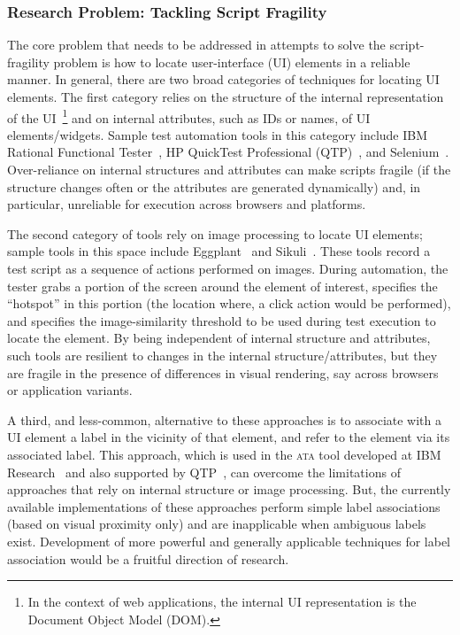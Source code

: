 \subsubsection*{Research Problem: Tackling Script Fragility}

The core problem that needs to be addressed in attempts to solve the
script-fragility problem is how to locate user-interface (UI) elements in a
reliable manner. In general, there are two broad categories of techniques for
locating UI elements. The first category relies on the structure of the internal
representation of the UI~\footnote{\small In the context of web applications,
  the internal UI representation is the Document Object Model (DOM).} and on
internal attributes, such as IDs or names, of UI elements/widgets. Sample test
automation tools in this category include IBM Rational Functional
Tester~\cite{ibmrft}, HP QuickTest Professional (QTP)~\cite{hpqtp}, and
Selenium~\cite{selenium}. Over-reliance on internal structures and attributes
can make scripts fragile (\eg if the structure changes often or the attributes
are generated dynamically) and, in particular, unreliable for execution across
browsers and platforms.

The second category of tools rely on image processing to locate UI elements;
sample tools in this space include Eggplant~\cite{Eggplant} and
Sikuli~\cite{Chang:2010, Yeh:2009}. These tools record a test script as a
sequence of actions performed on images. During automation, the tester grabs a
portion of the screen around the element of interest, specifies the ``hotspot''
in this portion (the location where, \eg a click action would be performed), and
specifies the image-similarity threshold to be used during test execution to
locate the element. By being independent of internal structure and attributes,
such tools are resilient to changes in the internal structure/attributes, but
they are fragile in the presence of differences in visual rendering, say across
browsers or application variants.

A third, and less-common, alternative to these approaches is to associate with a
UI element a label in the vicinity of that element, and refer to the element via
its associated label. This approach, which is used in the \textsc{ata} tool
developed at IBM Research~\cite{thummalapenta:2012b, thummalapenta:2012a,
  thummalapenta:2013a} and also supported by QTP~\cite{hpqtp}, can overcome the
limitations of approaches that rely on internal structure or image
processing. But, the currently available implementations of these approaches
perform simple label associations (based on visual proximity only) and are
inapplicable when ambiguous labels exist. Development of more powerful and
generally applicable techniques for label association would be a fruitful
direction of research.

